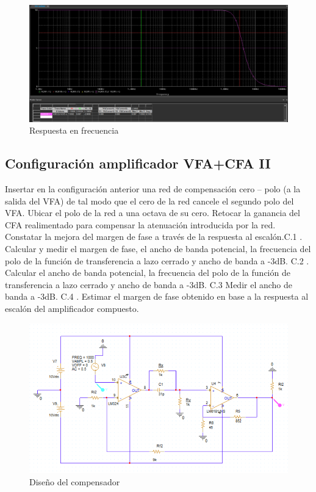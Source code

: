 \documentclass[12pt]{article}
\begin{document}
	\begin{figure}[h!]
		\includegraphics[width=1\linewidth]{Simulaciones_Imagenes/1.B_Frec_Resp}
		\caption[Respuesta en frecuencia]{Respuesta en frecuencia}
		\label{fig:6}
	\end{figure}
	
	\subsection{Configuración amplificador VFA+CFA II}
	Insertar en la configuración anterior una red de compensación cero – polo (a la salida del VFA)
	de tal modo que el cero de la red cancele el segundo polo del VFA. Ubicar el polo de la red a
	una octava de su cero. Retocar la ganancia del CFA realimentado para compensar la atenuación
	introducida por la red. Constatar la mejora del margen de fase a través de la respuesta al escalón.C.1 . Calcular y medir el margen de fase, el ancho de banda potencial, la frecuencia del polo de	la función de transferencia a lazo cerrado y ancho de banda a -3dB.
	C.2 . Calcular el ancho de banda potencial, la frecuencia del polo de la función de transferencia
	a lazo cerrado y ancho de banda a -3dB.
	C.3 Medir el ancho de banda a -3dB.
	C.4 . Estimar el margen de fase obtenido en base a la respuesta al escalón del amplificador
	compuesto.
	
	\begin{figure}
		\includegraphics[width=1\linewidth]{Simulaciones_Imagenes/1.C_Circ}
		\caption[Diseño del compensador]{Diseño del compensador}
		\label{fig:7}
	\end{figure}
	
\end{document}
